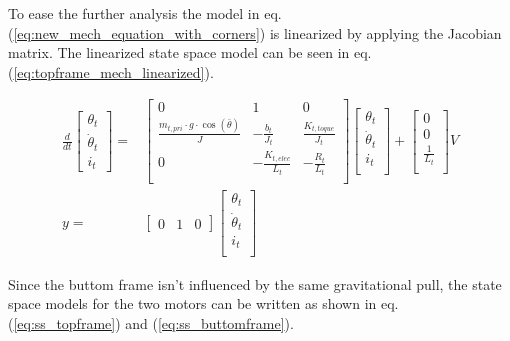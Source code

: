 \documentclass[../../main]{subfiles}
\begin{document}
To ease the further analysis the model in eq. (\ref{eq:new_mech_equation_with_corners}) is linearized by applying the Jacobian matrix. The linearized state space model can be seen in eq. (\ref{eq:topframe_mech_linearized}).

\begin{equation}
      \label{eq:topframe_mech_linearized}
      \begin{split}
      \frac{d}{dt}
    \begin{bmatrix}
        \theta_t \\
        \dot \theta_t \\
        i_t
    \end{bmatrix}
    =&
    \begin{bmatrix}
        0 & 1               & 0             \\
        \frac{m_{t,pri} \cdot g \cdot \cos(\bar \theta)}{J} & -\frac{b_t}{J_t}    & \frac{K_{t,toque}}{J_t} \\
        0 & -\frac{K_{t,elec}}{L_t}  & -\frac{R_t}{L_t}  \\
    \end{bmatrix}
    \begin{bmatrix}
        \theta_t \\
        \dot \theta_t \\
        i_t \\
    \end{bmatrix}
    +
    \begin{bmatrix}
        0 \\
        0 \\
        \frac{1}{L_t} \\
    \end{bmatrix}
    V
\\
      y =&
    \begin{bmatrix}
        0 & 1 & 0
    \end{bmatrix}
    \begin{bmatrix}
        \theta_t \\
        \dot \theta_t\\
        i_t\\
    \end{bmatrix}
    \end{split}
\end{equation}

Since the buttom frame isn't influenced by the same gravitational pull, the state space models for the two motors can be written as shown in eq. (\ref{eq:ss_topframe}) and (\ref{eq:ss_buttomframe}).
\end{document}
